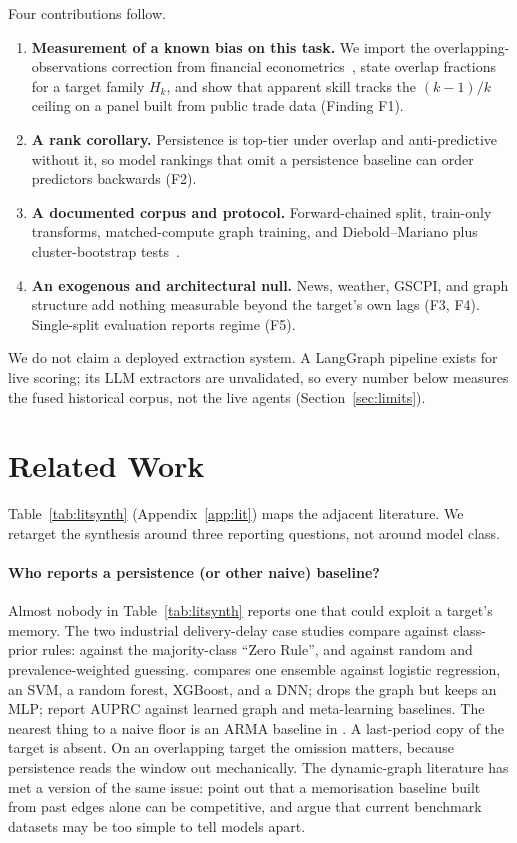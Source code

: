 \documentclass[10pt]{article}
\begin{document}
Four contributions follow.
\begin{enumerate}
\item \textbf{Measurement of a known bias on this task.} We import the overlapping-observations correction from financial econometrics~\citep{ref29,ref32}, state overlap fractions for a target family $H_k$, and show that apparent skill tracks the $(k-1)/k$ ceiling on a panel built from public trade data (Finding F1).
\item \textbf{A rank corollary.} Persistence is top-tier under overlap and anti-predictive without it, so model rankings that omit a persistence baseline can order predictors backwards (F2).
\item \textbf{A documented corpus and protocol.} Forward-chained split, train-only transforms, matched-compute graph training, and Diebold--Mariano plus cluster-bootstrap tests~\citep{ref28,ref33,ref34}.
\item \textbf{An exogenous and architectural null.} News, weather, GSCPI, and graph structure add nothing measurable beyond the target's own lags (F3, F4). Single-split evaluation reports regime (F5).
\end{enumerate}

We do not claim a deployed extraction system. A LangGraph pipeline exists for live scoring; its LLM extractors are unvalidated, so every number below measures the fused historical corpus, not the live agents (Section~\ref{sec:limits}).

\section{Related Work}
\label{sec:related}

Table~\ref{tab:litsynth} (Appendix~\ref{app:lit}) maps the adjacent literature. We retarget the synthesis around three reporting questions, not around model class.

\paragraph{Who reports a persistence (or other naive) baseline?}
Almost nobody in Table~\ref{tab:litsynth} reports one that could exploit a target's memory. The two industrial delivery-delay case studies compare against class-prior rules: \citet{ref35} against the majority-class ``Zero Rule'', and \citet{ref36} against random and prevalence-weighted guessing. \citet{ref2} compares one ensemble against logistic regression, an SVM, a random forest, XGBoost, and a DNN; \citet{ref5} drops the graph but keeps an MLP; \citet{ref7} report AUPRC against learned graph and meta-learning baselines. The nearest thing to a naive floor is an ARMA baseline in \citet{ref6}. A last-period copy of the target is absent. On an overlapping target the omission matters, because persistence reads the window out mechanically. The dynamic-graph literature has met a version of the same issue: \citet{ref14} point out that a memorisation baseline built from past edges alone can be competitive, and argue that current benchmark datasets may be too simple to tell models apart.
\end{document}
